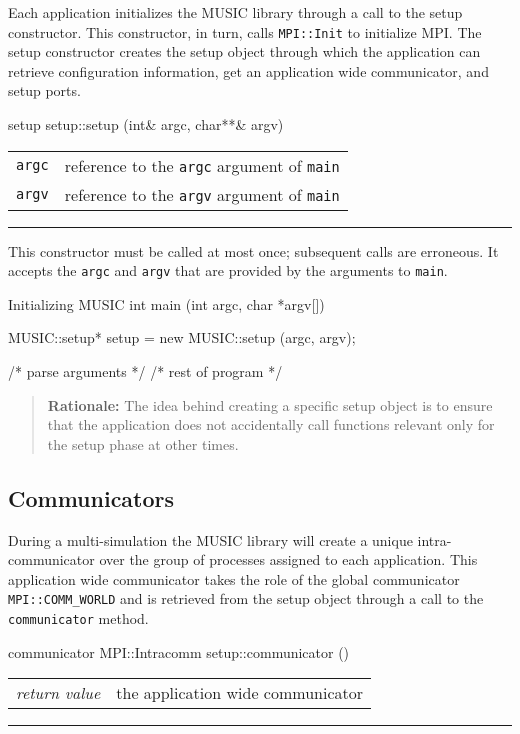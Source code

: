 \documentclass[a4paper,twoside]{report}
\makeatletter
\newenvironment{rationale}%
{\par\begin{quote}\textbf{Rationale:}}%
{\par\end{quote}}
\newenvironment{parameters}%
{\begin{tabular}{@{\hspace{2em}}lp{0.6\textwidth}}}%
{\end{tabular}\par\vspace{1mm}\par\hrule\par\vspace{5mm}}
\makeatother
\begin{document}
Each application initializes the MUSIC library through a call to the
setup constructor.  This constructor, in turn, calls
\lstinline|MPI::Init| to initialize
MPI.  The setup constructor creates the setup
object through which the application can retrieve configuration
information, get an application wide communicator, and setup ports.

\begin{head}{setup}
  setup::setup (int& argc, char**& argv)
\end{head}
\begin{parameters}
  \lstinline|argc| &%
  reference to the \lstinline|argc| argument of \lstinline|main| \\
  \lstinline|argv| &%
  reference to the \lstinline|argv| argument of \lstinline|main| \\
\end{parameters}

This constructor must be called at most once; subsequent calls are
erroneous.  It accepts the \lstinline|argc| and \lstinline|argv| that are
provided by the arguments to \lstinline|main|.

\begin{code}{Initializing MUSIC}
int main (int argc, char *argv[])
{
  MUSIC::setup* setup = new MUSIC::setup (argc, argv);

  /* parse arguments */
  /* rest of program */
}
\end{code}

\begin{rationale}
  The idea behind creating a specific setup object is to ensure that
  the application does not accidentally call functions relevant only
  for the setup phase at other times.
\end{rationale}


\subsection{Communicators}

During a multi-simulation the MUSIC library will create a unique
intra-communicator over the group of processes assigned to each
application.  This application wide communicator takes the role of the
global communicator \lstinline|MPI::COMM_WORLD| and is retrieved from
the setup object through a call to the \lstinline|communicator|
method.

\begin{head}{communicator}
  MPI::Intracomm setup::communicator ()
\end{head}
\begin{parameters}
  \emph{return value} & the application wide communicator \\
\end{parameters}
\end{document}
